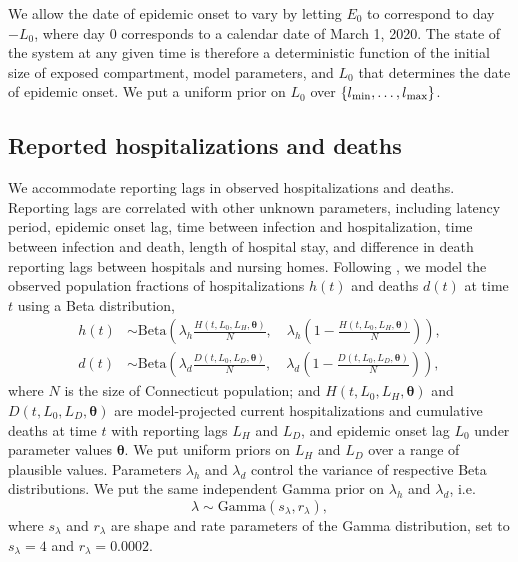 \documentclass[11pt]{article}
\newcommand{\btheta}{\boldsymbol{\theta}}
\begin{document}
We allow the date of epidemic onset to vary by letting $E_0$ to correspond to day $-L_0$, where day $0$ corresponds to a calendar date of March 1, 2020. 
The state of the system at any given time is therefore a deterministic function of the initial size of exposed compartment, model parameters, and $L_0$ that determines the date of epidemic onset. We put a uniform prior on $L_{0}$ over $\{l\textsubscript{min}, \ldots, l\textsubscript{max}\}$.



\subsection{Reported hospitalizations and deaths} 

We accommodate reporting lags in observed hospitalizations and deaths. Reporting lags are correlated with other unknown parameters, including latency period, epidemic onset lag, time between infection and hospitalization, time between infection and death, length of hospital stay, and difference in death reporting lags between hospitals and nursing homes. Following \citet{osthus2017forecasting}, we model the observed population fractions of hospitalizations $h(t)$ and deaths $d(t)$ at time $t$ using a Beta distribution,  
\begin{align}
h(t) &\sim \mbox{Beta} \left( \lambda_h \frac{H(t, L_0, L_H, \btheta)}{N}, \quad \lambda_h  \left( 1 - \frac{H(t, L_0, L_H, \btheta)}{N} \right) \right), \\
d(t) &\sim \mbox{Beta} \left( \lambda_d \frac{D(t, L_0, L_D, \btheta)}{N}, \quad \lambda_d  \left( 1 - \frac{D(t, L_0, L_D, \btheta)}{N} \right) \right), 
\end{align}
where $N$ is the size of Connecticut population; and $H(t, L_0, L_H, \btheta)$ and $D(t, L_0, L_D, \btheta)$ are model-projected current hospitalizations and cumulative deaths at time $t$ with reporting lags $L_H$ and $L_D$, and epidemic onset lag $L_0$ under parameter values $\btheta$. We put uniform priors on $L_H$ and $L_D$ over a range of plausible values.  Parameters $\lambda_h$ and $\lambda_d$ control the variance of respective Beta distributions. We put the same independent Gamma prior on $\lambda_h$ and $\lambda_d$, i.e.
\begin{equation}
\lambda \sim \mbox{Gamma} (s_\lambda, r_\lambda),
\label{eq:lamprior}
\end{equation}
where $s_\lambda$ and $r_\lambda$ are shape and rate parameters of the Gamma distribution, set to $s_\lambda = 4$ and $r_\lambda = 0.0002$.
\end{document}
